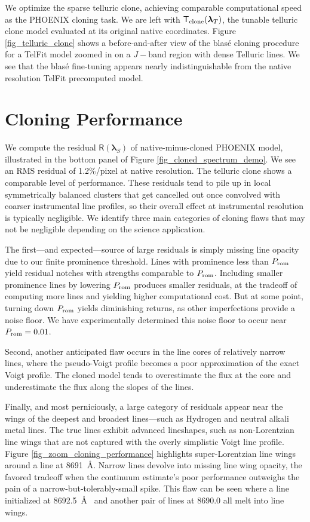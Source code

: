 \documentclass[twocolumn]{aastex631}
\begin{document}
We optimize the sparse telluric clone, achieving comparable computational speed as the PHOENIX cloning task.  We are left with $\mathsf{T}_{\rm clone}(\bm{\lambda}_T)$, the tunable telluric clone model evaluated at its original native coordinates.  Figure \ref{fig_telluric_clone} shows a before-and-after view of the blas\'e cloning procedure for a TelFit model zoomed in on a $J-$band region with dense Telluric lines.  We see that the blas\'e fine-tuning appears nearly indistinguishable from the native resolution TelFit precomputed model.



\section{Cloning Performance}

We compute the residual $\mathsf{R}(\bm{\lambda}_S)$ of native-minus-cloned PHOENIX model, illustrated in the bottom panel of Figure \ref{fig_cloned_spectrum_demo}. We see an RMS residual of 1.2\%/pixel at native resolution.  The telluric clone shows a comparable level of performance.  These residuals tend to pile up in local symmetrically balanced clusters that get cancelled out once convolved with coarser instrumental line profiles, so their overall effect at instrumental resolution is typically negligible.  We identify three main categories of cloning flaws that may not be negligible depending on the science application.

The first---and expected---source of large residuals is simply missing line opacity due to our finite prominence threshold. Lines with prominence less than $P_{\rm rom}$ yield residual notches with strengths comparable to $P_{\rm rom}$. Including smaller prominence lines by lowering $P_{\rm rom}$ produces smaller residuals, at the tradeoff of computing more lines and yielding higher computational cost.  But at some point, turning down $P_{\rm rom}$ yields diminishing returns, as other imperfections provide a noise floor.  We have experimentally determined this noise floor to occur near $P_{\rm rom}=0.01$.

Second, another anticipated flaw occurs in the line cores of relatively narrow lines, where the pseudo-Voigt profile becomes a poor approximation of the exact Voigt profile.  The cloned model tends to overestimate the flux at the core and underestimate the flux along the slopes of the lines.

Finally, and most perniciously, a large category of residuals appear near the wings of the deepest and broadest lines---such as Hydrogen and neutral alkali metal lines.  The true lines exhibit advanced lineshapes, such as non-Lorentzian line wings that are not captured with the overly simplistic Voigt line profile.  Figure \ref{fig_zoom_cloning_performance} highlights super-Lorentzian line wings around a line at 8691~\AA.  Narrow lines devolve into missing line wing opacity, the favored tradeoff when the continuum estimate's poor performance outweighs the pain of a narrow-but-tolerably-small spike. This flaw can be seen where a line initialized at 8692.5~\AA~ and another pair of lines at 8690.0 all melt into line wings.
\end{document}
